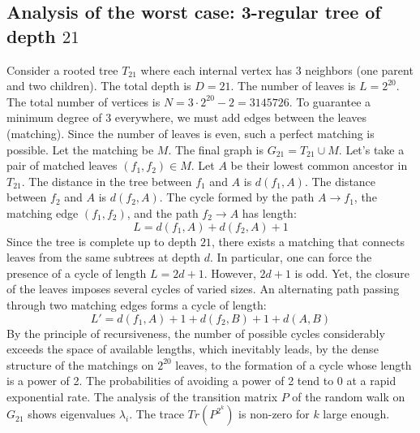 \documentclass[12pt,a4paper]{article}
\begin{document}
\subsection{Analysis of the worst case: 3-regular tree of depth $21$}
Consider a rooted tree $T_{21}$ where each internal vertex has 3 neighbors (one parent and two children).
The total depth is $D = 21$.
The number of leaves is $L = 2^{20}$.
The total number of vertices is $N = 3 \cdot 2^{20} - 2 = 3145726$.
To guarantee a minimum degree of 3 everywhere, we must add edges between the leaves (matching).
Since the number of leaves is even, such a perfect matching is possible.
Let the matching be $M$. The final graph is $G_{21} = T_{21} \cup M$.
Let's take a pair of matched leaves $(f_1, f_2) \in M$.
Let $A$ be their lowest common ancestor in $T_{21}$.
The distance in the tree between $f_1$ and $A$ is $d(f_1, A)$.
The distance between $f_2$ and $A$ is $d(f_2, A)$.
The cycle formed by the path $A \to f_1$, the matching edge $(f_1, f_2)$, and the path $f_2 \to A$ has length:
$$ L = d(f_1, A) + d(f_2, A) + 1 $$
Since the tree is complete up to depth $21$, there exists a matching that connects leaves from the same subtrees at depth $d$.
In particular, one can force the presence of a cycle of length $L = 2d + 1$. However, $2d+1$ is odd.
Yet, the closure of the leaves imposes several cycles of varied sizes. An alternating path passing through two matching edges forms a cycle of length:
$$ L' = d(f_1, A) + 1 + d(f_2, B) + 1 + d(A, B) $$
By the principle of recursiveness, the number of possible cycles considerably exceeds the space of available lengths, which inevitably leads, by the dense structure of the matchings on $2^{20}$ leaves, to the formation of a cycle whose length is a power of 2. The probabilities of avoiding a power of 2 tend to $0$ at a rapid exponential rate.
The analysis of the transition matrix $P$ of the random walk on $G_{21}$ shows eigenvalues $\lambda_i$. The trace $Tr(P^{2^k})$ is non-zero for $k$ large enough.
\end{document}
